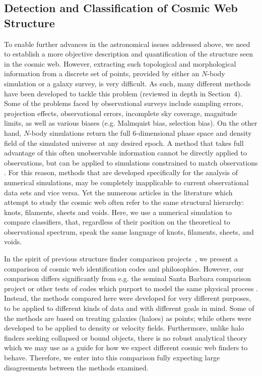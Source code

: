 \documentclass[useAMS,usenatbib]{mnras}
\begin{document}
\subsection{Detection and Classification of Cosmic Web Structure}
To enable further advances in the astronomical issues addressed above, we need to establish a more objective description 
and quantification of the structure seen in the cosmic web. However, extracting such topological and morphological information 
from a discrete set of points, provided by either an $N$-body simulation or a galaxy survey, is very difficult. As such, many different methods have been developed to tackle this problem (reviewed in depth in Section~4). Some of the problems faced by observational surveys include sampling errors, projection effects, observational errors, incomplete sky coverage, magnitude limits, as well as various biases (e.g. Malmquist bias, selection bias). On the other hand, $N$-body simulations return the full 6-dimensional phase space and density field of the simulated universe at any desired epoch. 
 A method that takes full advantage of this often unobservable information cannot be directly applied to observations, but can be applied to simulations constrained to match observations \citep[e.g.][]{2016arXiv160100093L}. For this reason, methods that are developed specifically for the analysis of numerical simulations, may be completely inapplicable to current observational data sets and vice versa. Yet the numerous articles in the literature which attempt to study the cosmic web often refer to the same structural hierarchy: knots, filaments, sheets and voids. Here, we use a numerical simulation to compare classifiers, that, regardless of their position on the theoretical to observational spectrum, speak the same language of knots, filaments, sheets, and voids.


In the spirit of previous structure finder comparison projects~\citep[][etc.]{Colberg2008,Knebe2011}, we present a comparison of cosmic web identification codes and philosophies. However, our comparison differs significantly from e.g. the seminal Santa Barbara comparison project \citep{1999ApJ...525..554F} or other tests of codes which purport to model the same physical process \citep[e.g.][]{2012MNRAS.423.1726S,2013MNRAS.435.1618K}. Instead, the methods compared here were developed for very different purposes, to be applied to different kinds of data and with different goals in mind. Some of the methods are based on treating galaxies (haloes) as points; while others were developed to be applied to density or velocity fields. Furthermore, unlike halo finders seeking collapsed or bound objects, there is no robust analytical theory \cite[such as the spherical top hat collapse model of][]{1999MNRAS.308..119S} which we may use as a guide for how we expect different cosmic web finders to behave. Therefore, we enter into this comparison fully expecting large disagreements between the methods examined.
\end{document}
